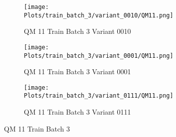 \documentclass{DissertateFigs}
\begin{document}
\begin{figure}[t!]
\medskip

    \begin{subfigure}{0.47\textwidth}
    \texttt{[image: Plots/train\_batch\_3/variant\_0010/QM11.png]}
    \caption{QM 11 Train Batch 3 Variant 0010}
    \end{subfigure}
    \begin{subfigure}{0.47\textwidth}
    \texttt{[image: Plots/train\_batch\_3/variant\_0001/QM11.png]}
    \caption{QM 11 Train Batch 3 Variant 0001}
    \end{subfigure}

\medskip

    \begin{subfigure}{0.47\textwidth}
    \texttt{[image: Plots/train\_batch\_3/variant\_0111/QM11.png]}
    \caption{QM 11 Train Batch 3 Variant 0111}
    \end{subfigure}
\caption{QM 11 Train Batch 3}
    \end{figure}
\clearpage
\end{document}
